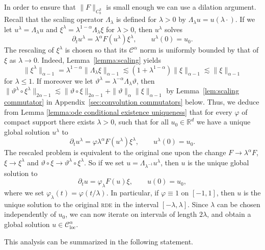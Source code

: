 \documentclass[11pt,a4paper]{article}
\newcommand{\tmop}[1]{\ensuremath{\operatorname{#1}}}
\theoremstyle{remark}
\newcommand{\CC}{\ensuremath{\mathscr{C}}}
\begin{document}
In order to ensure that $\| F \|_{C^{3}_{b}}$ is small enough we can use a
dilation argument. Recall that the scaling operator $\Lambda_\lambda$ is defined for $\lambda > 0$ by $\Lambda_\lambda u = u(\lambda \cdot)$. If we let $u^{\lambda} = \Lambda_{\lambda} u$ and
$\xi^{\lambda} = \lambda^{1- \alpha} \Lambda_{\lambda} \xi$ for $\lambda >0$,
then $u^{\lambda}$ solves
\[
   \partial_{t} u^{\lambda} = \lambda^{\alpha} F ( u^{\lambda} ) \xi^{\lambda}, \qquad u^\lambda(0) = u_0.
\]
The rescaling of $\xi^{\lambda}$ is chosen so that its $\CC^{\alpha}$ norm is
uniformly bounded by that of $\xi$ as $\lambda \rightarrow 0$. Indeed,
Lemma~\ref{lemma:scaling} yields
\[
   \| \xi^{\lambda} \|_{\alpha -1} = \lambda^{1- \alpha} \| \Lambda_{\lambda} \xi \|_{\alpha -1} \lesssim ( 1+ \lambda^{1- \alpha} ) \| \xi \|_{\alpha -1} \lesssim \| \xi \|_{\alpha -1}
\]
for $\lambda \leqslant 1$. If moreover we let $\vartheta^{\lambda} = \lambda^{- \alpha} \Lambda_{\lambda} \vartheta$, then $\| \vartheta^{\lambda} \circ \xi^{\lambda} \|_{2 \alpha -1} \lesssim \| \vartheta \circ   \xi \|_{2 \alpha -1} + \| \vartheta\|_\alpha \|\xi\|_{\alpha-1}$ by Lemma~\ref{lem:scaling commutator} in Appendix~\ref{sec:convolution commutators} below. Thus, we deduce from Lemma \ref{lemma:ode conditional existence uniqueness} that for every $\varphi$
of compact support there exists $\lambda >0$, such that for all $u_{0} \in \mathbb{R}^{d}$ we have a unique
global solution $u^{\lambda}$ to
\[
   \partial_{t} u^{\lambda} = \varphi \lambda^{\alpha} F ( u^{\lambda} ) \xi^{\lambda}, \qquad u^\lambda(0) = u_0.
\]
The rescaled problem is
equivalent to the original one upon the change $F \rightarrow \lambda^{\alpha} F$, $\xi \rightarrow \xi^{\lambda}$ and $\vartheta \circ   \xi \rightarrow \vartheta^{\lambda} \circ   \xi^{\lambda}$. So if we set $u= \Lambda_{\lambda^{-1}} u^{\lambda}$, then $u$ is the unique global solution to
\[
   \partial_{t} u= \varphi_{\lambda} F ( u ) \xi, \qquad u(0) = u_0,
\]
where we set $\varphi_\lambda(t) = \varphi(t/\lambda)$. In particular, if $\varphi \equiv 1$
on $[ -1,1 ]$, then $u$ is the unique solution to the original \textsc{rde} in the
interval $[ - \lambda, \lambda]$.
Since $\lambda$ can be chosen independently of $u_{0}$, we can now iterate on
intervals of length $2\lambda$, and obtain a global solution $u \in \CC^{\alpha}_{\tmop{loc}}$.



This analysis can be summarized in the following statement.
\end{document}
